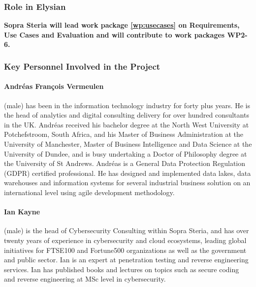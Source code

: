 \documentclass[a4paper,11pt]{article}
\begin{document}
\vspace{10pt}
\subsubsection*{Role in Elysian}
\textbf{Sopra Steria will lead work package \ref{wp:usecases} on Requirements, Use Cases and Evaluation and will contribute to work packages WP2-6.}


\vspace{10pt}
\subsubsection*{Key Personnel Involved in the Project}
\paragraph{Andr\'eas Fran\c{c}ois Vermeulen} (male) %
has been in the information technology industry for forty plus years. He is the head of analytics and digital consulting delivery for over hundred consultants in the UK. Andr\'eas received his bachelor degree at the North West University at Potchefstroom, South Africa, and his Master of Business Administration at the University of Manchester, Master of Business Intelligence and Data Science at the University of Dundee, and is busy undertaking a Doctor of Philosophy degree at the University of St Andrews. Andr\'eas is a General Data Protection Regulation (GDPR) certified professional. He has designed and implemented data lakes, data warehouses and information systems for several industrial business solution on an international level using agile development methodology. 


\paragraph{Ian Kayne} (male) is the head of Cybersecurity Consulting within Sopra Steria, and has
over twenty years of experience in cybersecurity and cloud ecosystems, leading global initiatives for FTSE100 and Fortune500 organizations as well as the government and public sector. Ian is an expert at penetration testing and reverse engineering services. Ian has published books and lectures on topics such as secure coding and reverse engineering at MSc level in cybersecurity.
\end{document}
